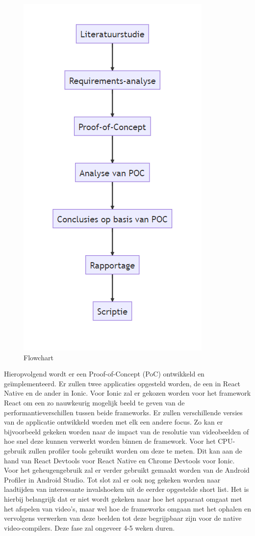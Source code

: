 \begin{figure}
  \centering
  \includegraphics[width=0.7\linewidth]{img/flowchart}
  \caption{Flowchart}
  \label{fig:flowchart}
\end{figure}

Hieropvolgend wordt er een Proof-of-Concept (PoC) ontwikkeld en geïmplementeerd. Er zullen twee applicaties opgesteld worden, de een in React Native en de ander in Ionic. Voor Ionic zal er gekozen worden voor het framework React om een zo nauwkeurig mogelijk beeld te geven van de performantieverschillen tussen beide frameworks. Er zullen verschillende versies van de applicatie ontwikkeld worden met elk een andere focus. Zo kan er bijvoorbeeld gekeken worden naar de impact van de resolutie van videobeelden of hoe snel deze kunnen verwerkt worden binnen de framework. Voor het CPU-gebruik zullen profiler tools gebruikt worden om deze te meten. Dit kan aan de hand van React Devtools voor React Native en Chrome Devtools voor Ionic. Voor het geheugengebruik zal er verder gebruikt gemaakt worden van de Android Profiler in Android Studio. Tot slot zal er ook nog gekeken worden naar laadtijden van interessante invalshoeken uit de eerder opgestelde short list. Het is hierbij belangrijk dat er niet wordt gekeken naar hoe het apparaat omgaat met het afspelen van video's, maar wel hoe de frameworks omgaan met het ophalen en vervolgens verwerken van deze beelden tot deze begrijpbaar zijn voor de native video-compilers. Deze fase zal ongeveer 4-5 weken duren.

